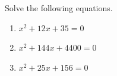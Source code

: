 Solve the following equations.
\begin{enumerate}
\item[(a)] $x^2+12x+35=0$
\item[(b)] $x^2+144x+4400=0$
\item[(c)] $x^2+25x+156=0$
\end{enumerate}
